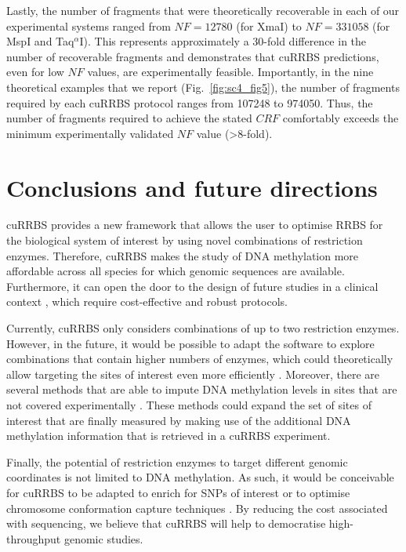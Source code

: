 \bigskip

Lastly, the number of fragments that were theoretically recoverable in each of our experimental systems ranged from $NF = 12780$ (for XmaI) to $NF = 331058$ (for MspI and Taq$^\alpha$I). This represents approximately a 30-fold difference in the number of recoverable fragments and demonstrates that cuRRBS predictions, even for low $NF$ values, are experimentally feasible. Importantly, in the nine theoretical examples that we report (Fig.~\ref{fig:sc4_fig5}), the number of fragments required by each cuRRBS protocol ranges from 107248 to 974050. Thus, the number of fragments required to achieve the stated $CRF$ comfortably exceeds the minimum experimentally validated $NF$ value (>8-fold). 

\smallskip

\section{Conclusions and future directions}

\smallskip

cuRRBS provides a new framework that allows the user to optimise RRBS for the biological system of interest by using novel combinations of restriction enzymes. Therefore, cuRRBS makes the study of DNA methylation more affordable across all species for which genomic sequences are available. Furthermore, it can open the door to the design of future studies in a clinical context \cite{Lee2014}, which require cost-effective and robust protocols.

\bigskip

Currently, cuRRBS only considers combinations of up to two restriction enzymes. However, in the future, it would be possible to adapt the software to explore combinations that contain higher numbers of enzymes, which could theoretically allow targeting the sites of interest even more efficiently \cite{Bystrykh2013}. Moreover, there are several methods that are able to impute DNA methylation levels in sites that are not covered experimentally \cite{Zhang2015,Angermueller2017}. These methods could expand the set of sites of interest that are finally measured by making use of the additional DNA methylation information that is retrieved in a cuRRBS experiment. 

\bigskip

Finally, the potential of restriction enzymes to target different genomic coordinates is not limited to DNA methylation. As such, it would be conceivable for cuRRBS to be adapted to enrich for SNPs of interest \cite{Davey2011,Davey2011a} or to optimise chromosome conformation capture techniques \cite{Naumova2012,Dekker2013}. By reducing the cost associated with sequencing, we believe that cuRRBS will help to democratise high-throughput genomic studies. 

